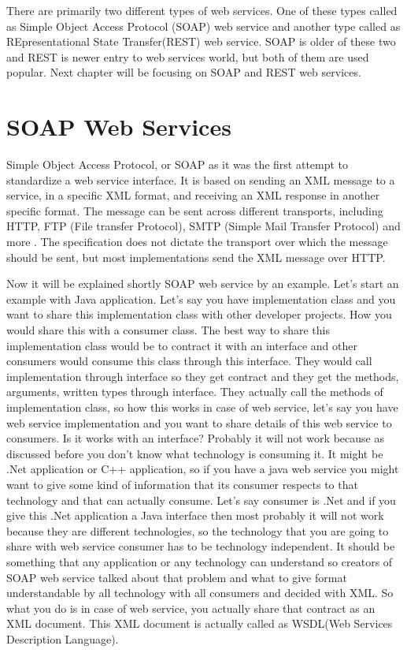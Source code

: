 There are primarily two different types of web services. One of these types called as  Simple Object Access Protocol (SOAP) web service and another type called as REpresentational State Transfer(REST) web service. SOAP is older of these two and REST is newer entry to web services world, but both of them are used popular. Next chapter will be focusing on SOAP and REST web services.

\section{SOAP Web Services}
\label{section:soa}

Simple Object Access Protocol, or SOAP as it was the first attempt to standardize a web service interface. It is based on sending an XML message to a service, in a specific XML format, and receiving an XML response in another specific format. The message can be sent across different transports, including HTTP, FTP (File transfer Protocol), SMTP (Simple Mail Transfer Protocol) and more \citep{thesis:state2}. The specification does not dictate the transport over which the message should be sent, but most implementations send the XML message over HTTP.

Now it will be explained shortly SOAP web service by an example. Let’s start an example with Java application. Let’s say you have implementation class and you want to share this implementation class with other developer projects. How you would share this with a consumer class. The best way to share this implementation class would be to contract it with an interface and other consumers would consume this class through this interface. They would call implementation through interface so they get contract and they get the methods, arguments, written types through interface. They actually call the methods of implementation class, so how this works in case of web service, let’s say you have web service implementation and you want to share details of this web service to consumers. Is it works with an interface? Probably it will not work because as discussed before you don’t know what technology is consuming it. It might be .Net application or C++ application, so if you have a java web service you might want to give some kind of information that its consumer respects to that technology and that can actually consume. Let’s say consumer is .Net and if you give this .Net application a Java interface then most probably it will not work because they are different technologies, so the technology that you are going to share with web service consumer has to be technology independent. It should be something that any application or any technology can understand so creators of SOAP web service talked about that problem and what to give format understandable by all technology with all consumers and decided with XML. So what you do is in case of web service, you actually share that contract as an XML document. This XML document is actually called as WSDL(Web Services Description Language)\citep{thesis:state3}.

